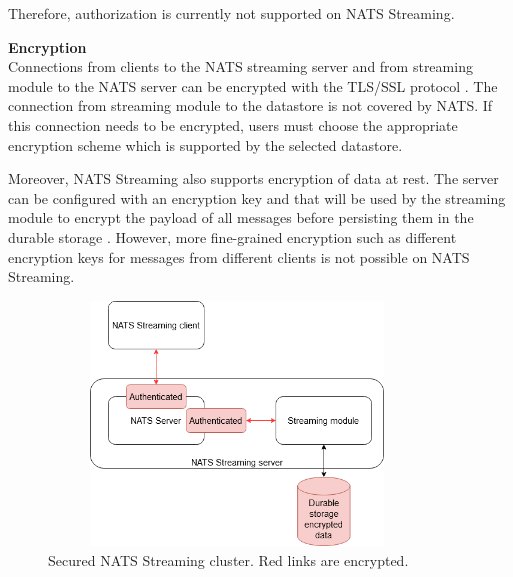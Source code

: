 Therefore, authorization is currently not supported on NATS Streaming. 

\textbf{Encryption}\\
Connections from clients to the NATS streaming server and from streaming module to the NATS server can be encrypted with the TLS/SSL protocol \cite{natssecurity}. The connection from streaming module to the datastore is not covered by NATS. If this connection needs to be encrypted, users must choose the appropriate encryption scheme which is supported by the selected datastore.

Moreover, NATS Streaming also supports encryption of data at rest. The server can be configured with an encryption key and that will be used by the streaming module to encrypt the payload of all messages before persisting them in the durable storage \cite{natstoreencryption}. However, more fine-grained encryption such as different encryption keys for messages from different clients is not possible on NATS Streaming.
\begin{figure}[h]
	\centering
	\includegraphics[width=10cm,height=6.5cm]{images/security-nats.png}
	\caption{Secured NATS Streaming cluster. Red links are encrypted.}
	\label{fig:securitynats}
\end{figure}
